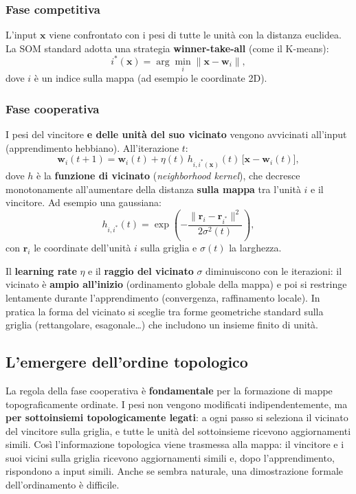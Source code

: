 \subsubsection{Fase competitiva}\label{fase-competitiva}

L'input \(\mathbf{x}\) viene confrontato con i pesi di tutte le unità
con la distanza euclidea. La SOM standard adotta una strategia
\textbf{winner-take-all} (come il K-means): \[
i^*(\mathbf{x}) = \arg\min_i \|\mathbf{x} - \mathbf{w}_i\|,
\] dove \(i\) è un indice sulla mappa (ad esempio le coordinate 2D).

\subsubsection{Fase cooperativa}\label{fase-cooperativa}

I pesi del vincitore \textbf{e delle unità del suo vicinato} vengono
avvicinati all'input (apprendimento hebbiano). All'iterazione \(t\): \[
\mathbf{w}_i(t+1) = \mathbf{w}_i(t) + \eta(t)\,h_{i,i^*(\mathbf{x})}(t)\,\big[\mathbf{x} - \mathbf{w}_i(t)\big],
\] dove \(h\) è la \textbf{funzione di vicinato} (\emph{neighborhood
kernel}), che decresce monotonamente all'aumentare della distanza
\textbf{sulla mappa} tra l'unità \(i\) e il vincitore. Ad esempio una
gaussiana: \[
h_{i,i^*}(t) = \exp\left(-\frac{\|\mathbf{r}_i - \mathbf{r}_{i^*}\|^2}{2\sigma^2(t)}\right),
\] con \(\mathbf{r}_i\) le coordinate dell'unità \(i\) sulla griglia e
\(\sigma(t)\) la larghezza.

Il \textbf{learning rate} \(\eta\) e il \textbf{raggio del vicinato}
\(\sigma\) diminuiscono con le iterazioni: il vicinato è \textbf{ampio
all'inizio} (ordinamento globale della mappa) e poi si restringe
lentamente durante l'apprendimento (convergenza, raffinamento locale).
In pratica la forma del vicinato si sceglie tra forme geometriche
standard sulla griglia (rettangolare, esagonale\ldots) che includono un
insieme finito di unità.

\subsection{L'emergere dell'ordine
topologico}\label{lemergere-dellordine-topologico}

La regola della fase cooperativa è \textbf{fondamentale} per la
formazione di mappe topograficamente ordinate. I pesi non vengono
modificati indipendentemente, ma \textbf{per sottoinsiemi
topologicamente legati}: a ogni passo si seleziona il vicinato del
vincitore sulla griglia, e tutte le unità del sottoinsieme ricevono
aggiornamenti simili. Così l'informazione topologica viene trasmessa
alla mappa: il vincitore e i suoi vicini sulla griglia ricevono
aggiornamenti simili e, dopo l'apprendimento, rispondono a input simili.
Anche se sembra naturale, una dimostrazione formale dell'ordinamento è
difficile.

